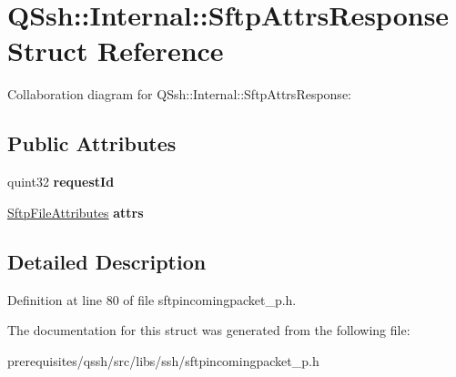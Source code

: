 \hypertarget{struct_q_ssh_1_1_internal_1_1_sftp_attrs_response}{}\section{Q\+Ssh\+:\+:Internal\+:\+:Sftp\+Attrs\+Response Struct Reference}
\label{struct_q_ssh_1_1_internal_1_1_sftp_attrs_response}


Collaboration diagram for Q\+Ssh\+:\+:Internal\+:\+:Sftp\+Attrs\+Response\+:
\subsection*{Public Attributes}
\begin{DoxyCompactItemize}
\item 
\mbox{\label{struct_q_ssh_1_1_internal_1_1_sftp_attrs_response_a7d9bbaab36392994d8c54c8e03a7eef5}} 
quint32 {\bfseries request\+Id}
\item 
\mbox{\label{struct_q_ssh_1_1_internal_1_1_sftp_attrs_response_a83b09d85fde73c13bc5fc39d0eec519b}} 
\mbox{\hyperlink{struct_q_ssh_1_1_internal_1_1_sftp_file_attributes}{Sftp\+File\+Attributes}} {\bfseries attrs}
\end{DoxyCompactItemize}


\subsection{Detailed Description}


Definition at line 80 of file sftpincomingpacket\+\_\+p.\+h.



The documentation for this struct was generated from the following file\+:\begin{DoxyCompactItemize}
\item 
prerequisites/qssh/src/libs/ssh/sftpincomingpacket\+\_\+p.\+h\end{DoxyCompactItemize}
